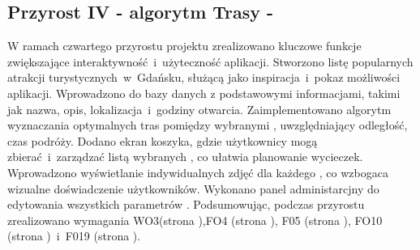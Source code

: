     \subsection{Przyrost IV - algorytm Trasy - }
    \label{sec:przyrost4}
    W ramach czwartego przyrostu projektu zrealizowano kluczowe funkcje zwiększające interaktywność~i~użyteczność aplikacji. \newline
    \indent Stworzono listę popularnych atrakcji turystycznych~w~Gdańsku, służącą jako inspiracja~i~pokaz możliwości aplikacji. \newline
    \indent Wprowadzono do bazy danych  z podstawowymi informacjami, takimi jak nazwa, opis, lokalizacja~i~godziny otwarcia. \newline
    \indent Zaimplementowano algorytm wyznaczania optymalnych tras pomiędzy wybranymi , uwzględniający odległość, czas podróży. \newline
    \indent Dodano ekran koszyka, gdzie użytkownicy mogą zbierać~i~zarządzać listą wybranych , co ułatwia planowanie wycieczek. \newline
    \indent Wprowadzono wyświetlanie indywidualnych zdjęć dla każdego , co wzbogaca wizualne doświadczenie użytkowników.\newline
    \indent Wykonano panel administarcjny do edytowania wszystkich parametrów .
    Podsumowując, podczas przyrostu zrealizowano wymagania WO3(strona \pageref{tab:requirements:general3}),FO4 (strona \pageref{tab:requirements:func4}), F05 (strona \pageref{tab:requirements:func5}), FO10 (strona \pageref{tab:requirements:func10})~i~F019 (strona \pageref{tab:requirements:func19}).




